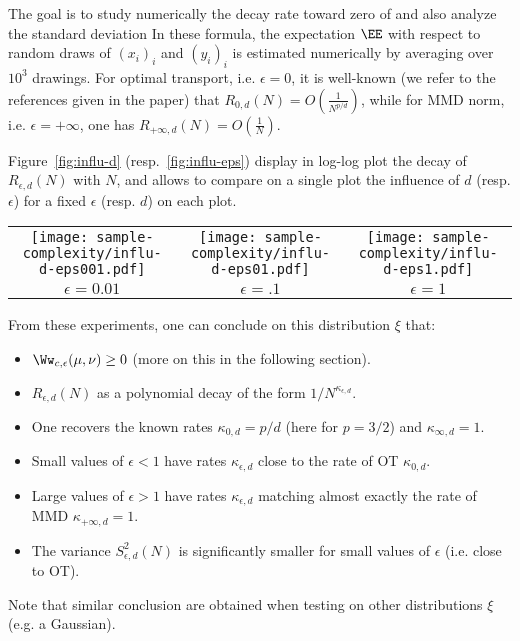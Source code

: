 The goal is to study numerically the decay rate toward zero of 
and also analyze the standard deviation
In these formula, the expectation $\EE$ with respect to random draws of $(x_i)_i$ and $(y_i)_i$ is estimated numerically by averaging over $10^3$ drawings.
%
For optimal transport, i.e. $\epsilon=0$, it is well-known (we refer to the references given in the paper) that $R_{0,d}(N) = O(\frac{1}{N^{p/d}})$, while for MMD norm, i.e. $\epsilon=+\infty$, one has $R_{+\infty,d}(N) = O(\frac{1}{N})$.


Figure~\ref{fig:influ-d} (resp.~\ref{fig:influ-eps}) display in log-log plot the decay of $R_{\epsilon,d}(N)$ with $N$, and allows to compare on a single plot the influence of $d$ (resp. $\epsilon$) for a fixed $\epsilon$ (resp. $d$) on each plot.

\begin{figure*}
\centering
\begin{tabular}{@{}c@{}c@{}c@{}}
\texttt{[image: sample-complexity/influ-d-eps001.pdf]}&
\texttt{[image: sample-complexity/influ-d-eps01.pdf]}&
\texttt{[image: sample-complexity/influ-d-eps1.pdf]}\\
$\epsilon=0.01$& $\epsilon=.1$ & $\epsilon=1$ 
\end{tabular}%
\caption{ Influence of the dimension $d$  on the sample complexity rate for difference $d$. The plot displays $\log_{10}(R_{\epsilon,d}(N))$ as a function of $\log(N)$. 
% 
The shaded bar display the confidence interval at $\pm S_{\epsilon,d}(N)$.
\label{fig:influ-d}}
\end{figure*}


From these experiments, one can conclude on this distribution $\xi$ that:
\begin{itemize}
	\item $\Ww_{c,\epsilon}(\mu,\nu) \geq 0$ (more on this in the following section).
	\item $R_{\epsilon,d}(N)$ as a polynomial decay of the form $1/N^{\kappa_{\epsilon,d}}$.
	\item One recovers the known rates $\kappa_{0,d}=p/d$ (here for $p=3/2$) and $\kappa_{\infty,d}=1$.	
	\item Small values of $\epsilon < 1$ have rates $\kappa_{\epsilon,d}$ close to the rate of OT $\kappa_{0,d}$.
	\item Large values of $\epsilon > 1$ have rates $\kappa_{\epsilon,d}$ matching almost exactly the rate of MMD $\kappa_{+\infty,d}=1$.
	\item The variance $S_{\epsilon,d}^2(N)$ is significantly smaller for small values of $\epsilon$ (i.e. close to OT). 
\end{itemize}
Note that similar conclusion are obtained when testing on other distributions $\xi$ (e.g. a Gaussian).


